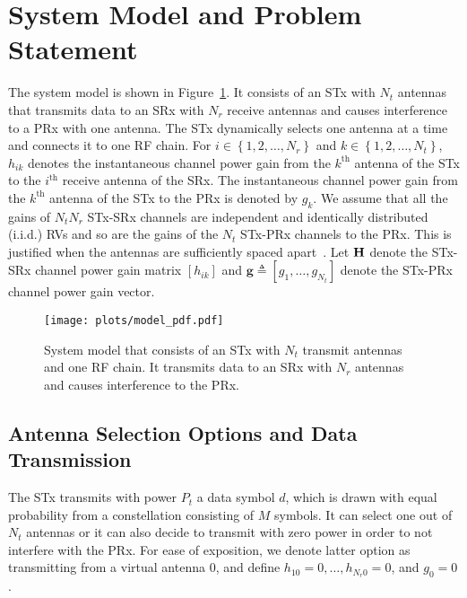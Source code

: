 \documentclass[12pt,draftcls,peerreview,onecolumn]{IEEEtran}
\newcommand{\define}{\triangleq}
\newcommand{\mtx}[1]{{\bf #1}} %
\newcommand{\nx}{{0}}
\newcommand{\Nt}{{N_t}}
\newcommand{\Nr}{{N_r}}
\newcommand{\Pt}{{P_t}}
\newcommand{\such}{h}
\newcommand{\puch}{g}
\newcommand{\hk}[1]{{\such_{#1}}}
\newcommand{\gk}[1]{{\puch_{#1}}}
\newcommand{\g}{\mathbf{\puch}}
\newcommand{\antopts}{\left\{1,2,\ldots,\Nt\right\}}
\newcommand{\nropts}{\left\{1,2,\ldots,\Nr\right\}}
\newcommand{\Hmx}{\mtx{H}}
\newcommand{\ith}{i^{\text{th}}}
\newcommand{\kth}{k^{\text{th}}}
\newcommand{\datasymbol}{d}
\begin{document}
\section{System Model and Problem Statement}
\label{sec:model}
The system model is shown in Figure~\ref{fig:MODEL}. It consists of an STx with $\Nt$ antennas that transmits data to an SRx with $\Nr$ receive antennas and causes interference to a PRx with one antenna. The STx dynamically selects one antenna at a time and connects it to one RF chain. For $i \in \nropts$ and $k \in \antopts$, $\hk{ik}$ denotes the instantaneous channel power gain from the $\kth$ antenna of the STx to the $\ith$ receive antenna of the SRx. The instantaneous channel power gain from the $\kth$ antenna of the STx to the PRx is denoted by $\gk{k}$. We assume that all the gains of $\Nt\Nr$ STx-SRx channels are independent and identically distributed (i.i.d.) RVs and so are the gains of the $\Nt$ STx-PRx channels to the PRx. This is justified when the antennas are sufficiently spaced apart~\cite{Fakhan_2014_TSP,Kong_2011_JCN,Sarvendranath_2013_TCOM,Hanif_2015_globecom}. Let $\Hmx$ denote the STx-SRx channel power gain matrix $\left[\hk{ik}\right]$ and $\g\define\left[\gk{1},\ldots,\gk{\Nt}\right]$ denote the STx-PRx channel power gain vector.

\begin{figure}
\centering 
\texttt{[image: plots/model\_pdf.pdf]}
\caption{System model that consists of an STx with $\Nt$ transmit antennas and one RF chain. It transmits data to an SRx with $\Nr$ antennas and causes interference to the PRx.}
\label{fig:MODEL}
\end{figure}



\subsection{Antenna Selection Options and Data Transmission}
The STx transmits with power $\Pt$ a data symbol $\datasymbol$, which is drawn with equal probability from a constellation consisting of $M$ symbols. It can select one out of $\Nt$ antennas or it can also decide to transmit with zero power in order to not interfere with the PRx. For ease of exposition, we denote latter option as transmitting from a virtual antenna $\nx$, and define $\hk{1\nx} = 0,\ldots,\hk{\Nr\nx} = 0$, and $\gk{\nx}= 0$. 
\end{document}
